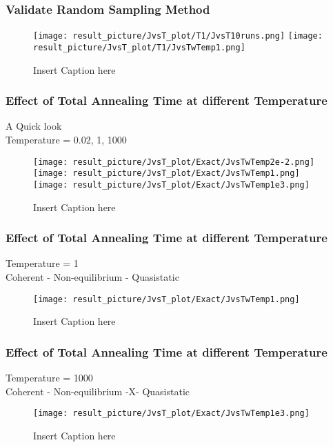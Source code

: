 \documentclass{beamer}
\begin{document}
\begin{frame}
	\frametitle{Validate Random Sampling Method}
	\begin{figure}
		\centering
		\texttt{[image: result\_picture/JvsT\_plot/T1/JvsT10runs.png]}
		\hfill
		\texttt{[image: result\_picture/JvsT\_plot/T1/JvsTwTemp1.png]}		
		
		\caption{Insert Caption here}
	\end{figure}
\end{frame}

\begin{frame}
	\frametitle{Effect of Total Annealing Time at different Temperature}
	A Quick look\\
	Temperature = 0.02, 1, 1000
	\begin{figure}
		\centering
		\texttt{[image: result\_picture/JvsT\_plot/Exact/JvsTwTemp2e-2.png]}
		\hfill
		\texttt{[image: result\_picture/JvsT\_plot/Exact/JvsTwTemp1.png]}
		\hfill
		\texttt{[image: result\_picture/JvsT\_plot/Exact/JvsTwTemp1e3.png]}
		\caption{Insert Caption here}
	\end{figure}
\end{frame}

\begin{frame}
	\frametitle{Effect of Total Annealing Time at different Temperature}
	Temperature = 1\\
	Coherent - Non-equilibrium - Quasistatic
	\begin{figure}
		\centering
		\texttt{[image: result\_picture/JvsT\_plot/Exact/JvsTwTemp1.png]}
		\caption{Insert Caption here}
	\end{figure}
\end{frame}

\begin{frame}
	\frametitle{Effect of Total Annealing Time at different Temperature}
	Temperature = 1000\\
	Coherent - Non-equilibrium -X- Quasistatic
	\begin{figure}
		\centering
		\texttt{[image: result\_picture/JvsT\_plot/Exact/JvsTwTemp1e3.png]}
		\caption{Insert Caption here}
	\end{figure}
\end{frame}
\end{document}
